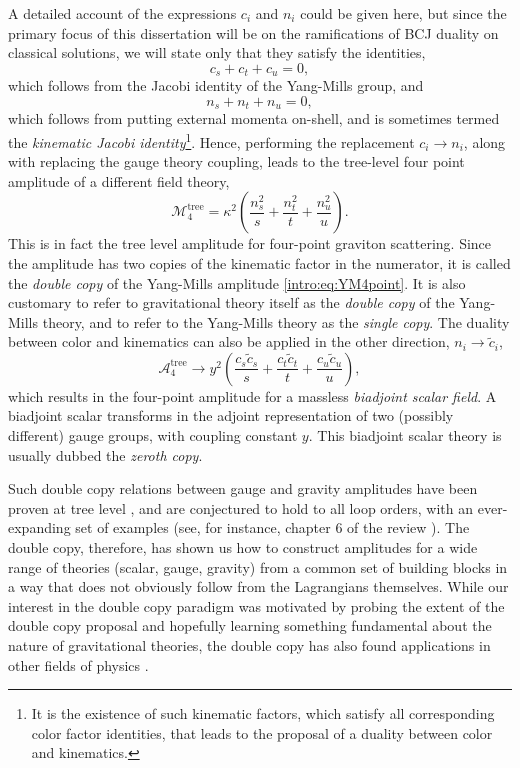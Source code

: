 A detailed account of the expressions $c_{i}$ and $n_{i}$ could be given here, but since the primary focus of this
dissertation will be on the ramifications of BCJ duality on classical solutions, we will state only that they
satisfy the identities,
\begin{equation} \label{} 
    c_{s} + c_{t} + c_{u} = 0, 
\end{equation}
which follows from the Jacobi identity of the Yang-Mills group, and 
\begin{equation} \label{} 
    n_{s} + n_{t} + n_{u} = 0,
\end{equation}
which follows from putting external momenta on-shell, and is sometimes termed the \textit{kinematic Jacobi
identity}\footnote{It is the existence of such kinematic factors, which satisfy all corresponding color factor
identities, that leads to the proposal of a duality between color and kinematics.}. Hence, performing the replacement $c_{i} \to n_{i}$, along with replacing the gauge theory coupling,
leads to the tree-level four point amplitude of a different field theory,
\begin{equation} \label{} 
    \mathcal{M}^{\text{tree}}_{4} = \kappa^{2} \left( \frac{n_{s}^{2}}{s} + \frac{n_{t}^{2}}{t} +
    \frac{n_{u}^{2}}{u}\right).
\end{equation}
This is in fact the tree level amplitude for four-point graviton scattering. Since the amplitude has two copies of
the kinematic factor in the numerator, it is called the \textit{double copy} of the Yang-Mills amplitude
\eqref{intro:eq:YM4point}. It is also customary to refer to gravitational theory itself as the \textit{double copy}
of the Yang-Mills theory, and to refer to the Yang-Mills theory as the \textit{single copy}. The duality between color and kinematics can also be applied in the other direction, $n_{i} \to \tilde{c}_{i}$,
\begin{equation} \label{} 
    \mathcal{A}_{4}^{\text{tree}} \to y^{2}\left( \frac{c_{s}\tilde{c}_{s}}{s} + \frac{c_{t}\tilde{c}_{t}}{t} +
    \frac{c_{u}\tilde{c}_{u}}{u} \right),
\end{equation}
which results in the four-point amplitude for a massless \textit{biadjoint scalar field}. A biadjoint scalar
transforms in the adjoint representation of two (possibly different) gauge groups, with coupling constant $y$.
This biadjoint scalar theory is usually dubbed the \textit{zeroth copy}.

Such double copy relations between gauge and gravity amplitudes have been proven at tree level \cite{Bern:2010yg},
and are conjectured to hold to all loop orders, with an ever-expanding set of examples (see, for instance, chapter
6 of the review \cite{Bern:2019prr}). The double copy, therefore, has shown us how to construct amplitudes for a wide
range of theories (scalar, gauge, gravity) from a common set of building blocks in a way that does not obviously
follow from the Lagrangians themselves. While our interest in the double copy paradigm was motivated by probing the
extent of the double copy proposal and hopefully learning something fundamental about the nature of gravitational
theories, the double copy has also found applications in other fields of physics \cite{Adamo:2022dcm}.

